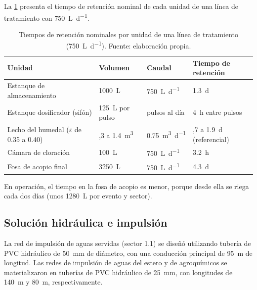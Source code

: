 La \cref{tab:tiempos-retencion} presenta el tiempo de retención nominal de cada unidad de una línea de tratamiento con \qty{750}{\liter\per\day}.

\begin{table}[htbp]
  \centering
  \caption{Tiempos de retención nominales por unidad de una línea de tratamiento (\qty{750}{\liter\per\day}). Fuente: elaboración propia.}
  \label{tab:tiempos-retencion}
  \begin{tabular}{@{}>{\raggedright\arraybackslash}p{4.6cm}>{\centering\arraybackslash}p{2.9cm}>{\centering\arraybackslash}p{2.6cm}>{\centering\arraybackslash}p{3.2cm}@{}}
    \toprule
    Unidad & Volumen & Caudal & Tiempo de retención \\
    \midrule
    Estanque de almacenamiento & \qty{1000}{\liter} & \qty{750}{\liter\per\day} & \qty{1.3}{\day} \\
    Estanque dosificador (sifón) & \qty{125}{\liter} por pulso & 6 pulsos al día & \qty{4}{\hour} entre pulsos \\
    Lecho del humedal ($\varepsilon$ de \num{0.35} a \num{0.40}) & 1,3 a \qty{1.4}{\cubic\meter} & \qty{0.75}{\cubic\meter\per\day} & 1,7 a \qty{1.9}{\day} (referencial) \\
    Cámara de cloración & \qty{100}{\liter} & \qty{750}{\liter\per\day} & \qty{3.2}{\hour} \\
    Fosa de acopio final & \qty{3250}{\liter} & \qty{750}{\liter\per\day} & \qty{4.3}{\day} \\
    \bottomrule
  \end{tabular}
\end{table}

En operación, el tiempo en la fosa de acopio es menor, porque desde ella se riega cada dos días (unos \qty{1280}{\liter} por evento y sector).

\subsection{Solución hidráulica e impulsión}

La red de impulsión de aguas servidas (sector 1.1) se diseñó utilizando tubería de PVC hidráulico de \qty{50}{\milli\meter} de diámetro, con una conducción principal de \qty{95}{\meter} de longitud.
Las redes de impulsión de aguas del estero y de agroquímicos se materializaron en tuberías de PVC hidráulico de \qty{25}{\milli\meter}, con longitudes de \qty{140}{\meter} y \qty{80}{\meter}, respectivamente.

